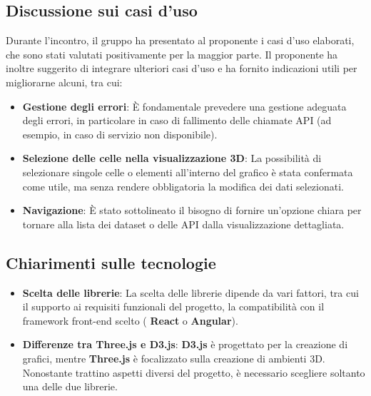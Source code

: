 \subsection{Discussione sui casi d'uso}
Durante l'incontro, il gruppo ha presentato al proponente i casi d'uso  elaborati, che sono stati valutati positivamente per la maggior parte. Il proponente ha inoltre suggerito di integrare ulteriori casi d'uso e ha fornito indicazioni utili per migliorarne alcuni, tra cui: 
\begin{itemize}
    \item \textbf{Gestione degli errori}:  
    È fondamentale prevedere una gestione adeguata degli errori, in particolare in caso di fallimento delle chiamate API (ad esempio, in caso di servizio non disponibile).
    
    \item \textbf{Selezione delle celle nella visualizzazione 3D}:  
    La possibilità di selezionare singole celle o elementi all'interno del grafico è stata confermata come utile, ma senza rendere obbligatoria la modifica dei dati selezionati.  

    \item \textbf{Navigazione}:  
    È stato sottolineato il bisogno di fornire un'opzione chiara per tornare alla lista dei dataset o delle API dalla visualizzazione dettagliata.  
\end{itemize}

\subsection{Chiarimenti sulle tecnologie}
\begin{itemize}
    \item \textbf{Scelta delle librerie}:  
    La scelta delle librerie dipende da vari fattori, tra cui il supporto ai requisiti funzionali del progetto, la compatibilità con il framework front-end scelto ( \textbf{React} o \textbf{Angular}). 

    \item \textbf{Differenze tra Three.js e D3.js}:  
    \textbf{D3.js} è progettato per la creazione di grafici, mentre \textbf{Three.js} è focalizzato sulla creazione di ambienti 3D. Nonostante trattino aspetti diversi del progetto, è necessario scegliere soltanto una delle due librerie.  

\end{itemize}
